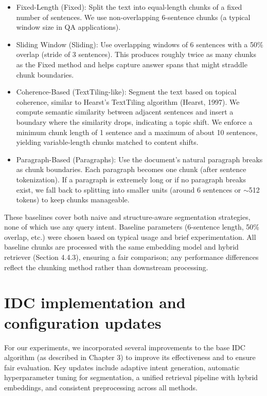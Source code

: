 \documentclass[12pt,a4paper]{report}
\begin{document}
\begin{itemize}
\item Fixed-Length (Fixed): Split the text into equal-length chunks of a fixed number of sentences. We use non-overlapping 6-sentence chunks (a typical window size in QA applications).

\item Sliding Window (Sliding): Use overlapping windows of 6 sentences with a 50\% overlap (stride of 3 sentences). This produces roughly twice as many chunks as the Fixed method and helps capture answer spans that might straddle chunk boundaries.

\item Coherence-Based (TextTiling-like): Segment the text based on topical coherence, similar to Hearst's TextTiling algorithm (Hearst, 1997). We compute semantic similarity between adjacent sentences and insert a boundary where the similarity drops, indicating a topic shift. We enforce a minimum chunk length of 1 sentence and a maximum of about 10 sentences, yielding variable-length chunks matched to content shifts.

\item Paragraph-Based (Paragraphs): Use the document's natural paragraph breaks as chunk boundaries. Each paragraph becomes one chunk (after sentence tokenization). If a paragraph is extremely long or if no paragraph breaks exist, we fall back to splitting into smaller units (around 6 sentences or $\sim$512 tokens) to keep chunks manageable.
\end{itemize}

These baselines cover both naive and structure-aware segmentation strategies, none of which use any query intent. Baseline parameters (6-sentence length, 50\% overlap, etc.) were chosen based on typical usage and brief experimentation. All baseline chunks are processed with the same embedding model and hybrid retriever (Section 4.4.3), ensuring a fair comparison; any performance differences reflect the chunking method rather than downstream processing.

\section{IDC implementation and configuration updates}

For our experiments, we incorporated several improvements to the base IDC algorithm (as described in Chapter 3) to improve its effectiveness and to ensure fair evaluation. Key updates include adaptive intent generation, automatic hyperparameter tuning for segmentation, a unified retrieval pipeline with hybrid embeddings, and consistent preprocessing across all methods.
\end{document}
